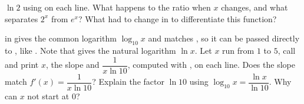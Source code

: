 \begin{parts}
    $\ln 2$ using  on each line. What happens to the ratio when $x$ changes, and
    what separates $2^x$ from $e^x$? What had to change in  to differentiate this
    function?
  \item {} in  gives the common logarithm $\log_{10} x$ and matches
    , so it can be passed directly to , like . Note
    that  gives the natural logarithm $\ln x$. Let $x$ run from $1$ to $5$, call
     and print $x$, the slope and $\dfrac{1}{x \ln 10}$, computed with
    , on each line. Does the slope match $f'(x) = \dfrac{1}{x \ln 10}$?
    Explain the factor $\ln 10$ using $\log_{10} x = \dfrac{\ln x}{\ln 10}$. Why can $x$ not start
    at $0$?
\end{parts}
